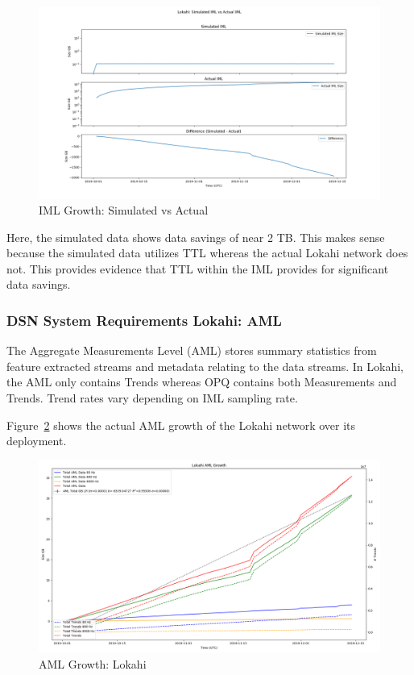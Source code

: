 \begin{figure}[H]
    \centering
    \includegraphics[width=\linewidth]{figures/lokahi_actual_iml_vs_sim.png}
    \caption{IML Growth: Simulated vs Actual}
    \label{fig:lokahi_actual_iml_vs_sim}
\end{figure}

Here, the simulated data shows data savings of near 2 TB. This makes sense because the simulated data utilizes TTL whereas the actual Lokahi network does not. This provides evidence that TTL within the IML provides for significant data savings.

\subsubsection{DSN System Requirements Lokahi: AML}

The Aggregate Measurements Level (AML) stores summary statistics from feature extracted streams and metadata relating to the data streams. In Lokahi, the AML only contains Trends whereas OPQ contains both Measurements and Trends. Trend rates vary depending on IML sampling rate.

Figure~\ref{fig:lokahi_actual_aml} shows the actual AML growth of the Lokahi network over its deployment.

\begin{figure}[H]
    \centering
    \includegraphics[width=\linewidth]{figures/lokahi_actual_aml.png}
    \caption{AML Growth: Lokahi}
    \label{fig:lokahi_actual_aml}
\end{figure}

